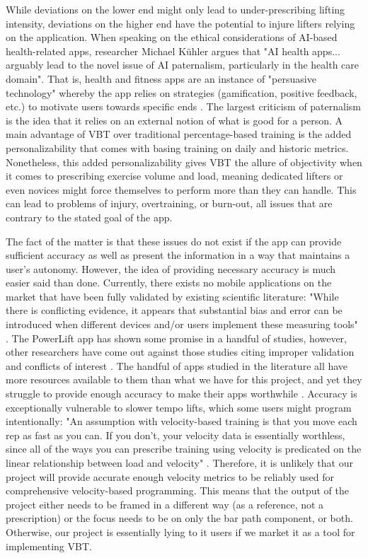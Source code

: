 \documentclass[10pt,twocolumn]{article}
\begin{document}
While deviations on the lower end might only lead to under-prescribing lifting intensity, deviations on the higher end have the potential to injure lifters relying on the application. When speaking on the ethical considerations of AI-based health-related apps, researcher Michael Kühler argues that "AI health apps... arguably lead to the novel issue of AI paternalism, particularly in the health care domain". That is, health and fitness apps are an instance of "persuasive technology" whereby the app relies on strategies (gamification, positive feedback, etc.) to motivate users towards specific ends \cite{Kuhler2022}. The largest criticism of paternalism is the idea that it relies on an external notion of what is good for a person. A main advantage of VBT over traditional percentage-based training is the added personalizability that comes with basing training on daily and historic metrics. Nonetheless, this added personalizability gives VBT the allure of objectivity when it comes to prescribing exercise volume and load, meaning dedicated lifters or even novices might force themselves to perform more than they can handle. This can lead to problems of injury, overtraining, or burn-out, all issues that are contrary to the stated goal of the app.\par

The fact of the matter is that these issues do not exist if the app can provide sufficient accuracy as well as present the information in a way that maintains a user's autonomy. However, the idea of providing necessary accuracy is much easier said than done. Currently, there exists no mobile applications on the market that have been fully validated by existing scientific literature: "While there is conflicting evidence, it appears that substantial bias and error can be introduced when different devices and/or users implement these measuring tools" \cite{Weakley2021}. The PowerLift app has shown some promise in a handful of studies, however, other researchers have come out against those studies citing improper validation and conflicts of interest \cite{Courel-Ibanez2020}. The handful of apps studied in the literature all have more resources available to them than what we have for this project, and yet they struggle to provide enough accuracy to make their apps worthwhile \cite{Martinez-Cava2020}. Accuracy is exceptionally vulnerable to slower tempo lifts, which some users might program intentionally: "An assumption with velocity-based training is that you move each rep as fast as you can. If you don’t, your velocity data is essentially worthless, since all of the ways you can prescribe training using velocity is predicated on the linear relationship between load and velocity" \cite{Nuckols2019}. Therefore, it is unlikely that our project will provide accurate enough velocity metrics to be reliably used for comprehensive velocity-based programming. This means that the output of the project either needs to be framed in a different way (as a reference, not a prescription) or the focus needs to be on only the bar path component, or both. Otherwise, our project is essentially lying to it users if we market it as a tool for implementing VBT.
\end{document}
